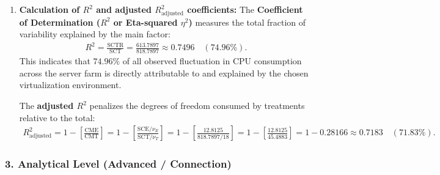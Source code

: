\begin{solproblema}
\begin{enumerate}
		\item \textbf{Calculation of $R^2$ and adjusted $R_{\text{adjusted}}^2$ coefficients:}
		The \textbf{Coefficient of Determination ($R^2$ or Eta-squared $\eta^2$)} measures the total fraction of variability explained by the main factor:
		\begin{align}
			R^2 = \frac{\text{SCTR}}{\text{SCT}} = \frac{613.7897}{818.7897} \approx 0.7496 \quad (74.96\%).
		\end{align}
		This indicates that $74.96\%$ of all observed fluctuation in CPU consumption across the server farm is directly attributable to and explained by the chosen virtualization environment.
		
		The \textbf{adjusted $R^2$} penalizes the degrees of freedom consumed by treatments relative to the total:
		\begin{align}
			R_{\text{adjusted}}^2 = 1 - \left[ \frac{\text{CME}}{\text{CMT}} \right] = 1 - \left[ \frac{\text{SCE}/\nu_E}{\text{SCT}/\nu_T} \right] = 1 - \left[ \frac{12.8125}{818.7897 / 18} \right] = 1 - \left[ \frac{12.8125}{45.4883} \right] = 1 - 0.28166 \approx 0.7183 \quad (71.83\%).
		\end{align}
	\end{enumerate}
\end{solproblema}

\subsubsection*{3. Analytical Level (Advanced / Connection)}

